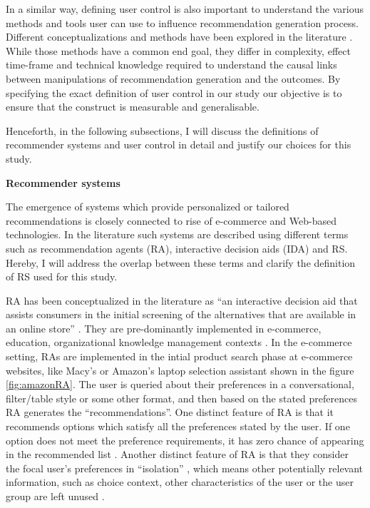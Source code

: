 \documentclass[a4paper,12pt]{article}
\begin{document}
In a similar way, defining user control is also important to understand the various methods and tools user can use to influence recommendation generation process. Different conceptualizations and methods have been explored in the literature \citep{pu2012evaluating}. While those methods have a common end goal, they differ in complexity,  effect time-frame and technical knowledge required to understand the causal links between manipulations of recommendation generation and the outcomes. By specifying the exact definition of user control in our study our objective is to ensure that the construct is measurable and generalisable. 

Henceforth, in the following subsections, I will discuss the definitions of recommender systems and user control in detail and justify our choices for this study.

\textbf{Recommender systems}\label{chapter:recommenderSystemsAgentsDifferentiation}

The emergence of systems which provide personalized or tailored recommendations is closely connected to rise of e-commerce and Web-based technologies. In the literature such systems are described using different terms such as recommendation agents (RA), interactive decision aids (IDA) and RS. Hereby, I will address the overlap between these terms and clarify the definition of RS used for this study.

RA has been conceptualized in the literature as ``an interactive decision aid that assists consumers in the initial screening of the alternatives that are available in 
an online store'' \citep{haubl2000consumer, xiao2007commerce}. They are pre-dominantly implemented in e-commerce, education, organizational knowledge management contexts \citep{xiao2007commerce}. In the e-commerce setting,  RAs are implemented in the intial product search phase at e-commerce websites, like Macy's or Amazon's laptop selection assistant shown in the figure \ref{fig:amazonRA}. The user is queried about their preferences in a conversational, filter/table style or some other  format, and then based on the stated preferences RA generates the ``recommendations''. One distinct feature of RA is that it recommends options which satisfy all the preferences stated by the user. If one option does not meet the preference requirements, it has zero chance of appearing in the recommended list \citep{haubl2000consumer}. Another distinct feature of RA is that they consider the focal user's preferences in ``isolation'' , which means other potentially relevant information, such as choice context, other characteristics of the user or the user group are left unused \citep{wang2008attributions}.
\end{document}
